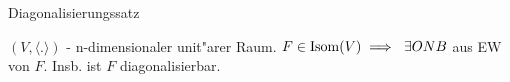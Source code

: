 \documentclass[class=article, crop=false]{standalone}
\begin{document}
\begin{zettel}{Diagonalisierungssatz}
\begin{flashcard}
	\begin{theorem}[Diagonalisierungssatz]
		$(V, \langle .\rangle) $ - n-dimensionaler unit"arer Raum. $F \in  \Isome(V) \implies \exists ONB$ aus EW von $F$. Insb. ist $F$ diagonalisierbar.
	\end{theorem}
\end{flashcard}
\end{zettel}
\end{document}
